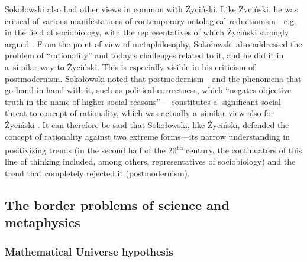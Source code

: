 \documentclass[%
  manuscript=article,
  year=2024,
  volume=77,
  doi=10.59203/zfn.77.689,
]{zfn}
\begin{document}
Sokołowski also had other views in common with Życiński. Like Życiński, he was critical of various manifestations of contemporary ontological reductionism---e.g. in the field of sociobiology, with the representatives of which Życiński strongly argued 
\parencites[][p.219]{Sokoowski2001Wspoczesne}[][pp.243–268]{Zycinski1993Granice}. %
 From the point of view of metaphilosophy, Sokołowski also addressed the problem of ``rationality'' and today's challenges related to it, and he did it in a~similar way to Życiński. This is especially visible in his criticism of postmodernism. Sokołowski noted that postmodernism---and the phenomena that go hand in hand with it, such as political correctness, which ``negates objective truth in the name of higher social reasons'' 
\parencite[][p.379]{Sokoowski2006Alicja}%
---constitutes a~significant social threat to concept of rationality, which was actually a~similar view also for Życiński 
\parencite[][]{Zycinski1994Postmodernistyczna}. %
 It can therefore be said that Sokołowski, like Życiński, defended the concept of rationality against two extreme forms---its narrow understanding in positivizing trends (in the second half of the 20\textsuperscript{th} century, the continuators of this line of thinking included, among others, representatives of sociobiology) and the trend that completely rejected it (postmodernism).



\subsection{ The border problems of science and metaphysics}



\subsubsection{Mathematical Universe hypothesis }
\end{document}
